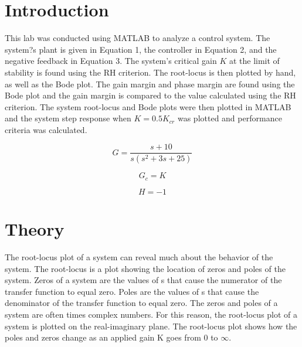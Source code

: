\documentclass[12pt]{article}
\begin{document}
\newpage



\section*{\fontsize{12}{12}\selectfont \large Introduction}
This lab was conducted using MATLAB to analyze a control system. The system?s plant is given in Equation 1, the controller in Equation 2, and the negative feedback in Equation 3. The system's critical gain $K$ at the limit of stability is found using the RH criterion. The root-locus is then plotted by hand, as well as the Bode plot. The gain margin and phase margin are found using the Bode plot and the gain margin is compared to the value calculated using the RH criterion. The system root-locus and Bode plots were then plotted in MATLAB and the system step response when $K = 0.5K_{cr}$ was plotted and performance criteria was calculated.
\bigskip

\begin{equation}
G = \frac{s + 10}{s(s^2 + 3s + 25)}
\end{equation}

\begin{equation}
G_{c} = K
\end{equation}

\begin{equation}
H = -1
\end{equation}



\section*{\fontsize{12}{12}\selectfont \large Theory}
The root-locus plot of a system can reveal much about the behavior of the system. The root-locus is a plot showing the location of zeros and poles of the system. Zeros of a system are the values of s that cause the numerator of the transfer function to equal zero. Poles are the values of s that cause the denominator of the transfer function to equal zero. The zeros and poles of a system are often times complex numbers. For this reason, the root-locus plot of a system is plotted on the real-imaginary plane. The root-locus plot shows how the poles and zeros change as an applied gain K goes from 0 to $\infty$.
\bigskip
\end{document}
